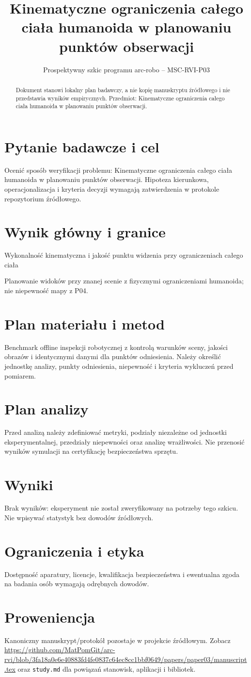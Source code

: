 \documentclass[11pt,a4paper]{article}
\title{Kinematyczne ograniczenia całego ciała humanoida w planowaniu punktów obserwacji}
\author{}
\date{Prospektywny szkic programu arc-robo -- MSC-RVI-P03}
\begin{document}
\maketitle
\begin{abstract}
Dokument stanowi lokalny plan badawczy, a nie kopię manuskryptu źródłowego i nie przedstawia wyników empirycznych. Przedmiot: Kinematyczne ograniczenia całego ciała humanoida w planowaniu punktów obserwacji.
\end{abstract}
\section{Pytanie badawcze i cel}
Ocenić sposób weryfikacji problemu: Kinematyczne ograniczenia całego ciała humanoida w planowaniu punktów obserwacji. Hipoteza kierunkowa, operacjonalizacja i kryteria decyzji wymagają zatwierdzenia w protokole repozytorium źródłowego.
\section{Wynik główny i granice}
Wykonalność kinematyczna i jakość punktu widzenia przy ograniczeniach całego ciała

Planowanie widoków przy znanej scenie z fizycznymi ograniczeniami humanoida; nie niepewność mapy z P04.
\section{Plan materiału i metod}
Benchmark offline inspekcji robotycznej z kontrolą warunków sceny, jakości obrazów i identycznymi danymi dla punktów odniesienia. Należy określić jednostkę analizy, punkty odniesienia, niepewność i kryteria wykluczeń przed pomiarem.
\section{Plan analizy}
Przed analizą należy zdefiniować metryki, podziały niezależne od jednostki eksperymentalnej, przedziały niepewności oraz analizę wrażliwości. Nie przenosić wyników symulacji na certyfikację bezpieczeństwa sprzętu.
\section{Wyniki}
Brak wyników: eksperyment nie został zweryfikowany na potrzeby tego szkicu. Nie wpisywać statystyk bez dowodów źródłowych.
\section{Ograniczenia i etyka}
Dostępność aparatury, licencje, kwalifikacja bezpieczeństwa i ewentualna zgoda na badania osób wymagają odrębnych dowodów.
\section{Proweniencja}
Kanoniczny manuskrypt/protokół pozostaje w projekcie źródłowym. Zobacz \url{https://github.com/MatPomGit/arc-rvi/blob/3fa18a0e6e40883fd4fe0837c64ec8cc1bbf0649/papers/paper03/manuscript.tex} oraz \texttt{study.md} dla powiązań stanowisk, aplikacji i bibliotek.
\end{document}
